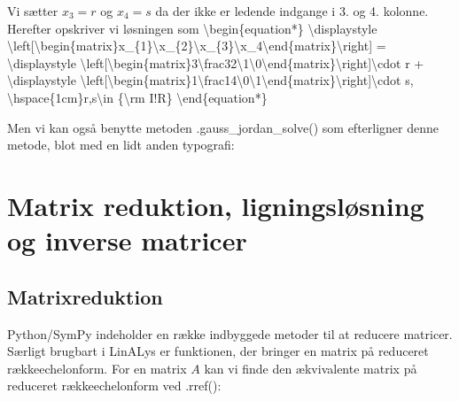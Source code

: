 \documentclass[letterpaper,10pt,english]{jupyterBook}
\begin{document}
\noindent{}

Vi sætter \(x_3 = r\) og \(x_4 = s\) da der ikke er ledende indgange i 3. og 4. kolonne. Herefter opskriver vi løsningen som
\textbackslash{}begin\{equation*\}
\textbackslash{}displaystyle \textbackslash{}left{[}\textbackslash{}begin\{matrix\}x\_\{1\}\textbackslash{}x\_\{2\}\textbackslash{}x\_\{3\}\textbackslash{}x\_4\textbackslash{}end\{matrix\}\textbackslash{}right{]} =
\textbackslash{}displaystyle \textbackslash{}left{[}\textbackslash{}begin\{matrix\}\sphinxhyphen{}3\sphinxhyphen{}\textbackslash{}frac32\textbackslash{}1\textbackslash{}0\textbackslash{}end\{matrix\}\textbackslash{}right{]}\textbackslash{}cdot r +
\textbackslash{}displaystyle \textbackslash{}left{[}\textbackslash{}begin\{matrix\}\sphinxhyphen{}1\sphinxhyphen{}\textbackslash{}frac14\textbackslash{}0\textbackslash{}1\textbackslash{}end\{matrix\}\textbackslash{}right{]}\textbackslash{}cdot s, \textbackslash{}hspace\{1cm\}r,s\textbackslash{}in \{\textbackslash{}rm I!R\}
\textbackslash{}end\{equation*\}

Men vi kan også benytte metoden .gauss\_jordan\_solve() som efterligner denne metode, blot med en lidt anden typografi:

\begin{sphinxVerbatim}[commandchars=\\\{\}]
  \PYG{p}{[}  \PYG{p}{]}
\end{sphinxVerbatim}

\noindent{}


\section{Matrix reduktion, ligningsløsning og inverse matricer}
\label{\detokenize{notebooks/sympy/Notebook_LinAlg1_5:matrix-reduktion-ligningslosning-og-inverse-matricer}}\label{\detokenize{notebooks/sympy/Notebook_LinAlg1_5::doc}}

\subsection{Matrix\sphinxhyphen{}reduktion}
\label{\detokenize{notebooks/sympy/Notebook_LinAlg1_5:matrix-reduktion}}
Python/SymPy indeholder en række indbyggede metoder til at reducere matricer. Særligt brugbart i LinALys er funktionen, der bringer en matrix på reduceret række\sphinxhyphen{}echelonform. For en matrix \(A\) kan vi finde den ækvivalente matrix på reduceret række\sphinxhyphen{}echelonform ved .rref():
\end{document}
